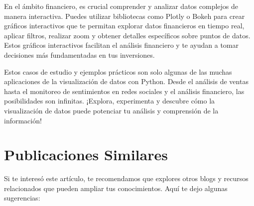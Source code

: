 \documentclass[
  a4paper,
]{article}
\begin{document}
En el ámbito financiero, es crucial comprender y analizar datos
complejos de manera interactiva. Puedes utilizar bibliotecas como Plotly
o Bokeh para crear gráficos interactivos que te permitan explorar datos
financieros en tiempo real, aplicar filtros, realizar zoom y obtener
detalles específicos sobre puntos de datos. Estos gráficos interactivos
facilitan el análisis financiero y te ayudan a tomar decisiones más
fundamentadas en tus inversiones.

Estos casos de estudio y ejemplos prácticos son solo algunas de las
muchas aplicaciones de la visualización de datos con Python. Desde el
análisis de ventas hasta el monitoreo de sentimientos en redes sociales
y el análisis financiero, las posibilidades son infinitas. ¡Explora,
experimenta y descubre cómo la visualización de datos puede potenciar tu
análisis y comprensión de la información!

\hypertarget{publicaciones-similares}{%
\section{Publicaciones Similares}\label{publicaciones-similares}}

Si te interesó este artículo, te recomendamos que explores otros blogs y
recursos relacionados que pueden ampliar tus conocimientos. Aquí te dejo
algunas sugerencias:


\printbibliography
\end{document}
